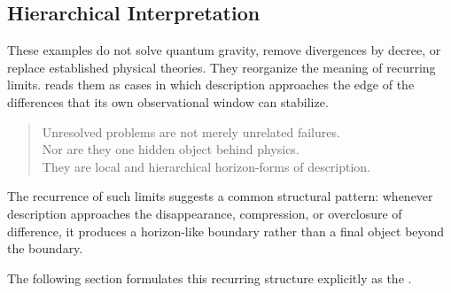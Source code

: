 \subsection{Hierarchical Interpretation}

These examples do not solve quantum gravity,
remove divergences by decree,
or replace established physical theories.
They reorganize the meaning of recurring limits.
\VED{} reads them as cases in which description approaches the edge
of the differences that its own observational window can stabilize.

\medskip
\begin{quote}
Unresolved problems are not merely unrelated failures.\\
Nor are they one hidden object behind physics.\\
They are local and hierarchical horizon-forms of description.
\end{quote}
\medskip

The recurrence of such limits suggests a common structural pattern:
whenever description approaches the disappearance,
compression,
or overclosure of difference,
it produces a horizon-like boundary rather than a final object beyond
the boundary.

The following section formulates this recurring structure explicitly
as the \DHP{}.
